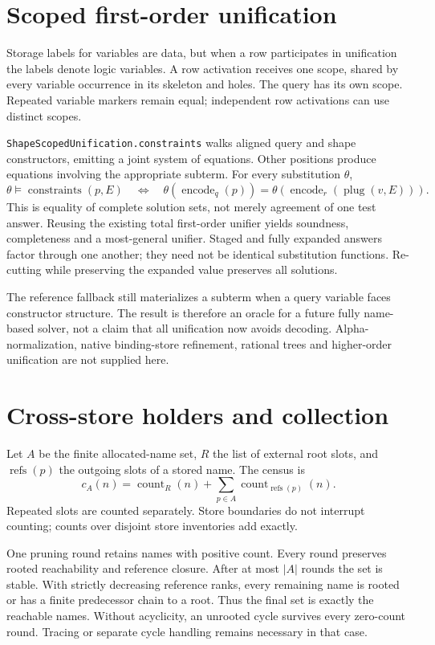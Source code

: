 \documentclass[11pt,a4paper]{article}
\newcommand{\code}[1]{\nolinkurl{#1}}
\begin{document}
\section{Scoped first-order unification}

Storage labels for variables are data, but when a row participates in
unification the labels denote logic variables. A row activation receives one
scope, shared by every variable occurrence in its skeleton and holes. The
query has its own scope. Repeated variable markers remain equal; independent
row activations can use distinct scopes.

\code{ShapeScopedUnification.constraints} walks aligned query and shape
constructors, emitting a joint system of equations. Other positions produce
equations involving the appropriate subterm. For every substitution $\theta$,
\[
 \theta\models\operatorname{constraints}(p,E)
 \quad\Longleftrightarrow\quad
 \theta(\operatorname{encode}_{q}(p))
   =\theta(\operatorname{encode}_{r}(\operatorname{plug}(v,E))).
\]
This is equality of complete solution sets, not merely agreement of one test
answer. Reusing the existing total first-order unifier yields soundness,
completeness and a most-general unifier. Staged and fully expanded answers
factor through one another; they need not be identical substitution functions.
Re-cutting while preserving the expanded value preserves all solutions.

The reference fallback still materializes a subterm when a query variable
faces constructor structure. The result is therefore an oracle for a future
fully name-based solver, not a claim that all unification now avoids decoding.
Alpha-normalization, native binding-store refinement, rational trees and
higher-order unification are not supplied here.

\section{Cross-store holders and collection}

Let $A$ be the finite allocated-name set, $R$ the list of external root slots,
and $\operatorname{refs}(p)$ the outgoing slots of a stored name. The census is
\[
 c_A(n)=\operatorname{count}_R(n)+
        \sum_{p\in A}\operatorname{count}_{\operatorname{refs}(p)}(n).
\]
Repeated slots are counted separately. Store boundaries do not interrupt
counting; counts over disjoint store inventories add exactly.

One pruning round retains names with positive count. Every round preserves
rooted reachability and reference closure. After at most $|A|$ rounds the
set is stable. With strictly decreasing reference ranks, every remaining
name is rooted or has a finite predecessor chain to a root. Thus the final
set is exactly the reachable names. Without acyclicity, an unrooted cycle
survives every zero-count round. Tracing or separate cycle handling remains
necessary in that case.
\end{document}
